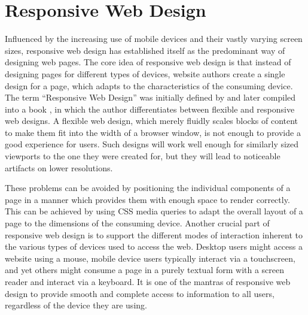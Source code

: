 \section{Responsive Web Design}
\label{sec:RWD}

Influenced by the increasing use of mobile devices and their vastly
varying screen sizes, responsive web design has established itself as
the predominant way of designing web pages. The core idea of
responsive web design is that instead of designing pages for different
types of devices, website authors create a single design for a page,
which adapts to the characteristics of the consuming device. The term
\enquote{Responsive Web Design} was initially defined by
\textcite{Marcotte-ALA-RWD} and later compiled into a book
\parencite{ResponsiveWebDesign1stEdition,
ResponsiveWebDesign2ndEdition}, in which the author differentiates
between flexible and responsive web designs. A flexible web design,
which merely fluidly scales blocks of content to make them fit into
the width of a browser window, is not enough to provide a good
experience for users. Such designs will work well enough for similarly
sized viewports to the one they were created for, but they will lead
to noticeable artifacts on lower resolutions.

These problems can be avoided by positioning the individual components
of a page in a manner which provides them with enough space to render
correctly. This can be achieved by using CSS media queries to adapt
the overall layout of a page to the dimensions of the consuming
device. Another crucial part of responsive web design is to support
the different modes of interaction inherent to the various types of
devices used to access the web. Desktop users might access a website
using a mouse, mobile device users typically interact via a
touchscreen, and yet others might consume a page in a purely textual
form with a screen reader and interact via a keyboard. It is one of
the mantras of responsive web design to provide smooth and complete
access to information to all users, regardless of the device they are
using.
